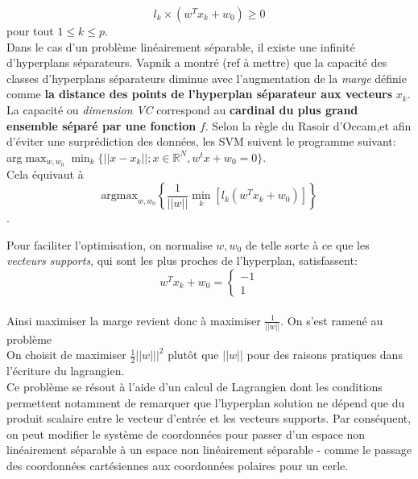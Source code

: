 \documentclass{article}
\theoremstyle{definition}
\newcommand{\R}{\mathbb R}
\begin{document}
\[ l_k\times \left(w^T x_k+w_0\right)\geq 0\] pour tout $1\leq k \leq p$.\\

\noindent Dans le cas d'un problème linéairement séparable, il existe une infinité d'hyperplans séparateurs. Vapnik a montré (ref à mettre) que la capacité des classes d'hyperplans séparateurs diminue avec l'augmentation de la \textit{marge} définie comme \textbf{la distance des points de l'hyperplan séparateur aux vecteurs} $x_k$. La capacité ou \textit{dimension VC} correspond au \textbf{cardinal du plus grand ensemble séparé par une fonction} $f$. Selon la règle du Rasoir d'Occam,et afin d'éviter une surprédiction des données, les SVM suivent le programme suivant:
arg$\displaystyle\max_{w,w_0}\min_k\{||x-x_k||;x\in \R^N,w^tx+w_0=0\}$.\\

\noindent Cela équivaut à 
\[\text{argmax}_{w,w_0}\left\lbrace\frac{1}{||w||}\min_k\left[l_k \left(w^T x_k+w_0\right)\right]\right\rbrace\].

\noindent Pour faciliter l'optimisation, on normalise $w,w_0$ de telle sorte à ce que les \textit{vecteurs supports}, qui sont les plus proches de l'hyperplan, satisfassent:
\begin{equation*}
w^Tx_{k}+w_0=\begin{cases}
	-1\\
	1
\end{cases}
\end{equation*}
\\
\noindent Ainsi maximiser la marge revient donc à maximiser $\frac{1}{||w||}$. On s'est ramené au problème
\\ 

\noindent On choisit de maximiser $\frac{1}{2} ||w|||^2$ plutôt que $||w||$ pour des raisons pratiques dans l'écriture du lagrangien. \\

\noindent Ce problème se résout à l'aide d'un calcul de Lagrangien dont les conditions permettent notamment de remarquer que l'hyperplan solution ne dépend que du produit scalaire entre le vecteur d'entrée et les vecteurs supports. Par conséquent, on peut modifier le système de coordonnées pour passer d'un espace non linéairement séparable à un espace non linéairement séparable - comme le passage des coordonnées cartésiennes aux coordonnées polaires pour un cerle.\\
\end{document}
